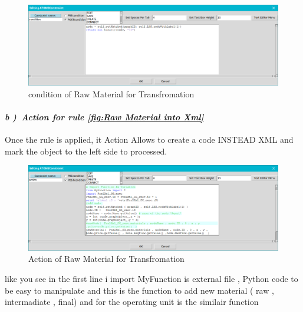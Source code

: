 \begin{figure}[th]
	\centering  %
 	\includegraphics[scale=0.38]{Chapiter3/img/xcond1}
	\caption{\label{fig:condition of Raw Material for Transfromation}condition of Raw Material for Transfromation}
\end{figure}
\paragraph{\emph{ b )~Action for rule \ref{fig:Raw Material into Xml} } }  Once the rule is applied, it Action Allows to create a code INSTEAD XML and mark the object to the left side to processed.  
 
\begin{figure}[th]
	\centering  %
 	\includegraphics[scale=0.38]{Chapiter3/img/xact1}
	\caption{\label{fig:Action of Raw Material for Transfromation}Action of Raw Material for Transfromation}
\end{figure} 
\vspace{1cm}
like you see in the first line i import MyFunction is external file , Python code 
to be easy to manipulate  and this is the function to add new material ( raw , intermadiate , final)
and for the operating unit is the similair function
 
